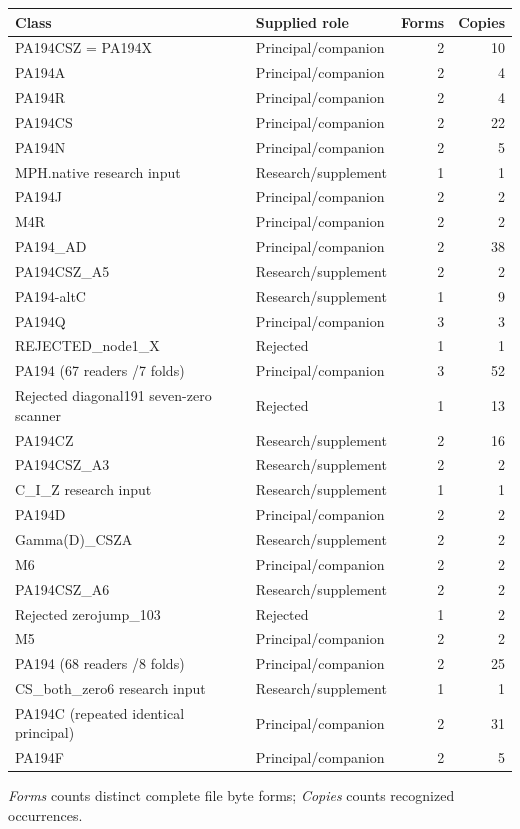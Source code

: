 \begingroup\small
\begin{longtable}{@{}p{.49\linewidth}p{.29\linewidth}rr@{}}
\toprule Class & Supplied role & Forms & Copies\\\midrule\endhead
PA194CSZ = PA194X & Principal/companion & 2 & 10\\[3pt]
PA194A & Principal/companion & 2 & 4\\[3pt]
PA194R & Principal/companion & 2 & 4\\[3pt]
PA194CS & Principal/companion & 2 & 22\\[3pt]
PA194N & Principal/companion & 2 & 5\\[3pt]
MPH.native research input & Research/supplement & 1 & 1\\[3pt]
PA194J & Principal/companion & 2 & 2\\[3pt]
M4R & Principal/companion & 2 & 2\\[3pt]
PA194\_AD & Principal/companion & 2 & 38\\[3pt]
PA194CSZ\_A5 & Research/supplement & 2 & 2\\[3pt]
PA194-altC & Research/supplement & 1 & 9\\[3pt]
PA194Q & Principal/companion & 3 & 3\\[3pt]
REJECTED\_node1\_X & Rejected & 1 & 1\\[3pt]
PA194 (67 readers /7 folds) & Principal/companion & 3 & 52\\[3pt]
Rejected diagonal191 seven-zero scanner & Rejected & 1 & 13\\[3pt]
PA194CZ & Research/supplement & 2 & 16\\[3pt]
PA194CSZ\_A3 & Research/supplement & 2 & 2\\[3pt]
C\_I\_Z research input & Research/supplement & 1 & 1\\[3pt]
PA194D & Principal/companion & 2 & 2\\[3pt]
Gamma(D)\_CSZA & Research/supplement & 2 & 2\\[3pt]
M6 & Principal/companion & 2 & 2\\[3pt]
PA194CSZ\_A6 & Research/supplement & 2 & 2\\[3pt]
Rejected zerojump\_103 & Rejected & 1 & 2\\[3pt]
M5 & Principal/companion & 2 & 2\\[3pt]
PA194 (68 readers /8 folds) & Principal/companion & 2 & 25\\[3pt]
CS\_both\_zero6 research input & Research/supplement & 1 & 1\\[3pt]
PA194C (repeated identical principal) & Principal/companion & 2 & 31\\[3pt]
PA194F & Principal/companion & 2 & 5\\[3pt]
\bottomrule\end{longtable}\endgroup
\emph{Forms} counts distinct complete file byte forms; \emph{Copies} counts recognized occurrences.
